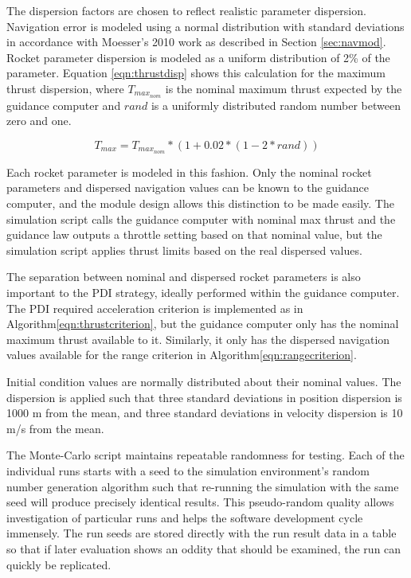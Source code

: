 The dispersion factors are chosen to reflect realistic parameter dispersion. Navigation error is modeled using a normal distribution with standard deviations in accordance with Moesser's 2010\:\cite{MOESSER} work as described in Section \ref{sec:navmod}. Rocket parameter dispersion is modeled as a uniform distribution of 2\% of the parameter. Equation \ref{eqn:thrustdisp} shows this calculation for the maximum thrust dispersion, where $T_{max_{nom}}$ is the nominal maximum thrust expected by the guidance computer and $rand$ is a uniformly distributed random number between zero and one.

\begin{equation}
\label{eqn:thrustdisp}
T_{max} = T_{max_{nom}}*(1+0.02*(1-2*rand))
\end{equation}

Each rocket parameter is modeled in this fashion. Only the nominal rocket parameters and dispersed navigation values can be known to the guidance computer, and the module design allows this distinction to be made easily. The simulation script calls the guidance computer with nominal max thrust and the guidance law outputs a throttle setting based on that nominal value, but the simulation script applies thrust limits based on the real dispersed values. 

The separation between nominal and dispersed rocket parameters is also important to the PDI strategy, ideally performed within the guidance computer. The PDI required acceleration criterion is implemented as in Algorithm\:\ref{eqn:thrustcriterion}, but the guidance computer only has the nominal maximum thrust available to it. Similarly, it only has the dispersed navigation values available for the range criterion in Algorithm\:\ref{eqn:rangecriterion}.

Initial condition values are normally distributed about their nominal values. The dispersion is applied such that three standard deviations in position dispersion is 1000 m from the mean, and three standard deviations in velocity dispersion is 10 m/s from the mean. 

The Monte-Carlo script maintains repeatable randomness for testing. Each of the individual runs starts with a seed to the simulation environment's random number generation algorithm such that re-running the simulation with the same seed will produce precisely identical results. This pseudo-random quality allows investigation of particular runs and helps the software development cycle immensely. The run seeds are stored directly with the run result data in a table so that if later evaluation shows an oddity that should be examined, the run can quickly be replicated.

